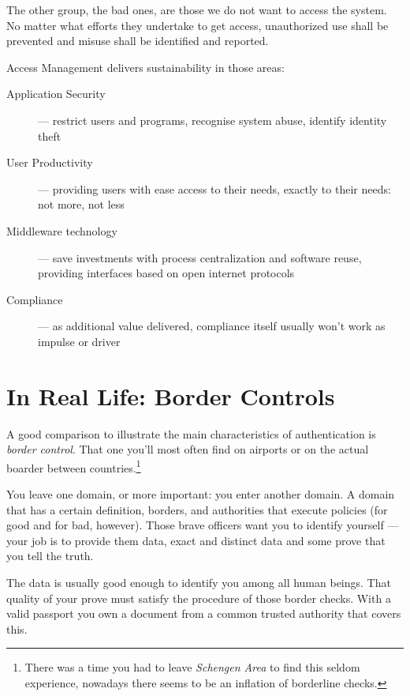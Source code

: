 \documentclass[11pt]{report}
\begin{document}
The other group, the bad ones, are those we do not want to access the
system. No matter what efforts they undertake to get access,
unauthorized use shall be prevented and misuse shall be identified and
reported.

Access Management delivers sustainability in those areas:

\begin{description}

    \item[Application Security] --- restrict users and programs, recognise
        system abuse, identify identity theft
    \item[User Productivity] --- providing users with ease access to their
        needs, exactly to their needs: not more, not less
    \item[Middleware technology] --- save investments with process
        centralization and software reuse, providing interfaces based
        on open internet protocols
    \item[Compliance] --- as additional value delivered, compliance itself
        usually won't work as impulse or driver

\end{description}




\section{In Real Life: Border Controls}

A good comparison to illustrate the main characteristics of
authentication is \emph{border control}. That one you'll most often find
on airports or on the actual boarder between countries.\footnote{There
    was a time you had to leave \emph{Schengen Area} to find this seldom
experience, nowadays there seems to be an inflation of borderline
checks.}

You leave one domain, or more important: you enter another domain. 
A domain that has a certain definition, borders, and authorities that 
execute policies (for good and for bad, however).  Those brave officers 
want you to identify yourself --- your job is to provide them data, exact 
and distinct data and some prove that you tell the truth.

The data is usually good enough to identify you among all human beings.
That quality of your prove must satisfy the procedure of those border
checks. With a valid passport you own a document from a common trusted
authority that covers this.
\end{document}
